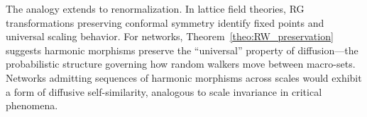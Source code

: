 \documentclass[twocolumn,superscriptaddress,tightenlines,aps,prx,floatfix]{revtex4-2}
\begin{document}
\begin{bibunit}
The analogy extends to renormalization. In lattice field theories, RG transformations preserving conformal symmetry identify fixed points and universal scaling behavior. For networks, Theorem~\ref*{theo:RW_preservation} suggests harmonic morphisms preserve the ``universal'' property of diffusion---the probabilistic structure governing how random walkers move between macro-sets. Networks admitting sequences of harmonic morphisms across scales would exhibit a form of diffusive self-similarity, analogous to scale invariance in critical phenomena.


\clearpage

\putbib[biblio]
\end{bibunit}
\end{document}
